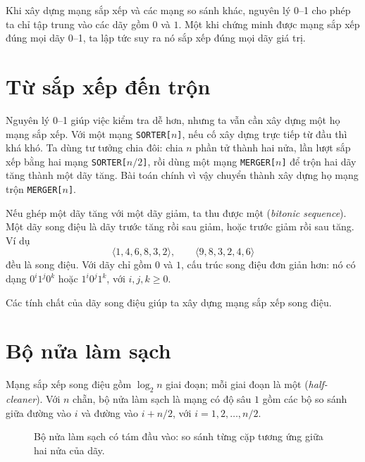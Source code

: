 \documentclass[11pt]{article}
\newcommand{\comp}[3]{%
  \draw (#1,#2) -- (#1,#3);
  \fill (#1,#2) circle (1.6pt);
  \fill (#1,#3) circle (1.6pt);
}
\newcommand{\eightwires}[2]{%
  \foreach \y in {0,-1,-2,-3,-4,-5,-6,-7} {
    \draw (#1,\y) -- (#2,\y);
  }
}
\begin{document}
Khi xây dựng mạng sắp xếp và các mạng so sánh khác, nguyên lý 0--1 cho phép ta
chỉ tập trung vào các dãy gồm $0$ và $1$. Một khi chứng minh được mạng sắp xếp
đúng mọi dãy 0--1, ta lập tức suy ra nó sắp xếp đúng mọi dãy giá trị.

\section{Từ sắp xếp đến trộn}

Nguyên lý 0--1 giúp việc kiểm tra dễ hơn, nhưng ta vẫn cần xây dựng một họ
mạng sắp xếp. Với một mạng \texttt{SORTER[$n$]}, nếu cố xây dựng trực tiếp từ
đầu thì khá khó. Ta dùng tư tưởng chia đôi: chia $n$ phần tử thành hai nửa, lần
lượt sắp xếp bằng hai mạng \texttt{SORTER[$n/2$]}, rồi dùng một mạng
\texttt{MERGER[$n$]} để trộn hai dãy tăng thành một dãy tăng. Bài toán chính
vì vậy chuyển thành xây dựng họ mạng trộn \texttt{MERGER[$n$]}.

Nếu ghép một dãy tăng với một dãy giảm, ta thu được một 
(\emph{bitonic sequence}). Một dãy song điệu là dãy trước tăng rồi sau giảm,
hoặc trước giảm rồi sau tăng. Ví dụ
\[
  \langle 1,4,6,8,3,2\rangle,\qquad
  \langle 9,8,3,2,4,6\rangle
\]
đều là song điệu. Với dãy chỉ gồm $0$ và $1$, cấu trúc song điệu đơn giản hơn:
nó có dạng $0^i1^j0^k$ hoặc $1^i0^j1^k$, với $i,j,k\ge 0$.

Các tính chất của dãy song điệu giúp ta xây dựng mạng sắp xếp song điệu.

\section{Bộ nửa làm sạch}

Mạng sắp xếp song điệu gồm $\log_2 n$ giai đoạn; mỗi giai đoạn là một
 (\emph{half-cleaner}). Với $n$ chẵn, bộ nửa làm sạch là
mạng có độ sâu $1$ gồm các bộ so sánh giữa đường vào $i$ và đường vào
$i+n/2$, với $i=1,2,\ldots,n/2$.

\begin{figure}[ht]
\centering
{}
\caption{Bộ nửa làm sạch có tám đầu vào: so sánh từng cặp tương ứng giữa hai
nửa của dãy.}
\end{figure}
\end{document}
